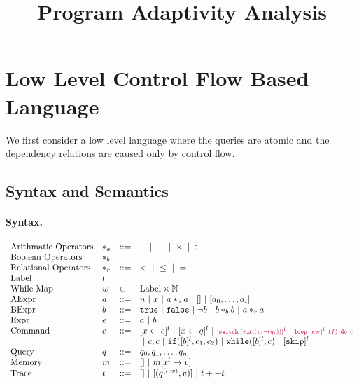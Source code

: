 \documentclass[a4paper,11pt]{article}
\begin{document}
\title{Program Adaptivity Analysis}

\author{}

\date{}


\maketitle

\tableofcontents
\newpage
\section{Low Level Control Flow Based Language}
We first consider a low level language where the queries are atomic
and the dependency relations are caused only by control flow.
%
\subsection{Syntax and Semantics}
%
\paragraph{Syntax.}
\[
\begin{array}{llll}
 \mbox{Arithmatic Operators} & *_a & ::= & + ~|~ - ~|~ \times 
%
~|~ \div \\  
  \mbox{Boolean Operators} & *_b & & \\
   \mbox{Relational Operators} & *_r & ::= & < ~|~ \leq ~|~ = \\  
 \mbox{Label} & l & & \\ 
 \mbox{While Map} & w & \in & \mbox{Label} \times \mathbb{N} \\
\mbox{AExpr} & \aexpr & ::= & 
  n ~|~ x ~|~ \aexpr *_a \aexpr ~|~ [] ~|~ [\aexpr_0, \dots, \aexpr_i] \\
\mbox{BExpr} & \bexpr & ::= & 
  \etrue ~|~ \efalse  ~|~ \neg \bexpr
   ~|~ \bexpr *_b \bexpr
  ~|~ \aexpr *_r \aexpr \\
\mbox{Expr} & \expr & ::= & \aexpr \sep \bexpr \\ 
\mbox{Command} & c & ::= &   [\assign x \expr]^{l} ~|~  [\assign x q]^{l}
%
~|~ \jl{[\eswitch( \expr, x, (v_i \to  q_i))]^{l} \sep \eloop ~ [\expr_N]^{l} ~ (f) ~ \edo ~ c }  \\ 
& & & ~|~  c ; c ~|~ \eif([\bexpr]^{l}, c_1, c_2) 
  ~|~ \ewhile([\bexpr]^{l}, c) ~|~ [\eskip]^{l} 
  \\
\mbox{Query} & q& ::= & q_{0} , q_{1} , \ldots , q_{n}\\  
\mbox{Memory} & m & ::= & [] ~|~ m[x^{l} \to v] \\
%
\mbox{Trace} & t & ::= & [] ~|~ [(q ^{(l, w) }, v)] ~|~ t ++ t
\end{array}
\]
%
\end{document}

